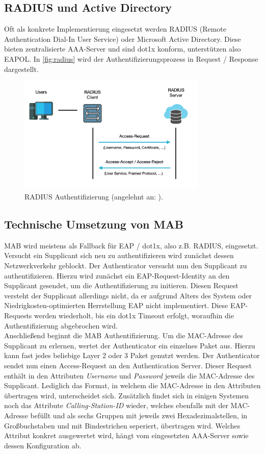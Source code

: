\documentclass[conference]{IEEEtran}
\begin{document}
\subsection{RADIUS und Active Directory}
Oft als konkrete Implementierung eingesetzt werden RADIUS (Remote Authentication Dial-In User Service) oder Microsoft Active Directory. Diese bieten zentralisierte AAA-Server und sind dot1x konform, unterstützen also EAPOL. In \autoref{fig:radius} wird der Authentifizierungsprozess in Request / Response dargestellt.

\begin{figure}[hbt]
	\centering
	\includegraphics[width=9cm]{figures/radius}
	\caption{RADIUS Authentifizierung (angelehnt an: \cite{radius}).}
	\label{fig:radius}
\end{figure}

\subsection{Technische Umsetzung von MAB}
MAB wird meistens als Fallback für EAP / dot1x, also z.B. RADIUS, eingesetzt. Versucht ein Supplicant sich neu zu authentifizieren wird zunächst dessen Netzwerkverkehr geblockt. Der Authenticator versucht nun den Supplicant zu authentifizieren. Hierzu wird zunächst ein EAP-Request-Identity an den Supplicant gesendet, um die Authentifizierung zu initieren. Diesen Request versteht der Supplicant allerdings nicht, da er aufgrund Alters des System oder Niedrigkosten-optimierten Herrstellung EAP nicht implementiert. Diese EAP-Requests werden wiederholt, bis ein dot1x Timeout erfolgt, woraufhin die Authentifizierung abgebrochen wird.\\

Anschließend beginnt die MAB Authentifizierung. Um die MAC-Adresse des Supplicant zu erlernen, wertet der Authenticator ein einzelnes Paket aus. Hierzu kann fast jedes beliebige Layer 2 oder 3 Paket genutzt werden. Der Authenticator sendet nun einen Access-Request an den Authentication Server. Dieser Request enthält in den Attributen \emph{Username} und \emph{Password} jeweils die MAC-Adresse des Supplicant. Lediglich das Format, in welchem die MAC-Adresse in den Attributen übertragen wird, unterscheidet sich. Zusätzlich findet sich in einigen Systemen noch das Attribute \emph{Calling-Station-ID} wieder, welches ebenfalls mit der MAC-Adresse befüllt und als sechs Gruppen mit jeweils zwei Hexadezimalstellen, in Großbuchstaben und mit Bindestrichen seperiert, übertragen wird. Welches Attribut konkret ausgewertet wird, hängt vom eingesetzten AAA-Server sowie dessen Konfiguration ab.\\
\end{document}

